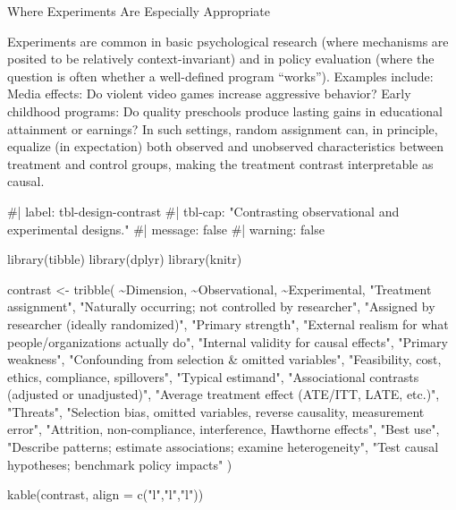 \documentclass[
  letterpaper,
  DIV=11,
  numbers=noendperiod]{scrreprt}
\newenvironment{Shaded}{\begin{snugshade}}{\end{snugshade}}
\newcommand{\AttributeTok}[1]{\textcolor[rgb]{0.40,0.45,0.13}{#1}}
\newcommand{\CommentTok}[1]{\textcolor[rgb]{0.37,0.37,0.37}{#1}}
\newcommand{\FunctionTok}[1]{\textcolor[rgb]{0.28,0.35,0.67}{#1}}
\newcommand{\NormalTok}[1]{\textcolor[rgb]{0.00,0.23,0.31}{#1}}
\newcommand{\OtherTok}[1]{\textcolor[rgb]{0.00,0.23,0.31}{#1}}
\newcommand{\SpecialCharTok}[1]{\textcolor[rgb]{0.37,0.37,0.37}{#1}}
\newcommand{\StringTok}[1]{\textcolor[rgb]{0.13,0.47,0.30}{#1}}
\begin{document}
Where Experiments Are Especially Appropriate

Experiments are common in basic psychological research (where mechanisms
are posited to be relatively context-invariant) and in policy evaluation
(where the question is often whether a well-defined program ``works'').
Examples include: Media effects: Do violent video games increase
aggressive behavior? Early childhood programs: Do quality preschools
produce lasting gains in educational attainment or earnings? In such
settings, random assignment can, in principle, equalize (in expectation)
both observed and unobserved characteristics between treatment and
control groups, making the treatment contrast interpretable as causal.

\begin{Shaded}
\begin{Highlighting}[]
\CommentTok{\#| label: tbl{-}design{-}contrast}
\CommentTok{\#| tbl{-}cap: "Contrasting observational and experimental designs."}
\CommentTok{\#| message: false}
\CommentTok{\#| warning: false}

\FunctionTok{library}\NormalTok{(tibble)}
\FunctionTok{library}\NormalTok{(dplyr)}
\FunctionTok{library}\NormalTok{(knitr)}

\NormalTok{contrast }\OtherTok{\textless{}{-}} \FunctionTok{tribble}\NormalTok{(}
  \SpecialCharTok{\textasciitilde{}}\NormalTok{Dimension, }\SpecialCharTok{\textasciitilde{}}\NormalTok{Observational, }\SpecialCharTok{\textasciitilde{}}\NormalTok{Experimental,}
  \StringTok{"Treatment assignment"}\NormalTok{, }\StringTok{"Naturally occurring; not controlled by researcher"}\NormalTok{, }\StringTok{"Assigned by researcher (ideally randomized)"}\NormalTok{,}
  \StringTok{"Primary strength"}\NormalTok{, }\StringTok{"External realism for what people/organizations actually do"}\NormalTok{, }\StringTok{"Internal validity for causal effects"}\NormalTok{,}
  \StringTok{"Primary weakness"}\NormalTok{, }\StringTok{"Confounding from selection \& omitted variables"}\NormalTok{, }\StringTok{"Feasibility, cost, ethics, compliance, spillovers"}\NormalTok{,}
  \StringTok{"Typical estimand"}\NormalTok{, }\StringTok{"Associational contrasts (adjusted or unadjusted)"}\NormalTok{, }\StringTok{"Average treatment effect (ATE/ITT, LATE, etc.)"}\NormalTok{,}
  \StringTok{"Threats"}\NormalTok{, }\StringTok{"Selection bias, omitted variables, reverse causality, measurement error"}\NormalTok{, }\StringTok{"Attrition, non{-}compliance, interference, Hawthorne effects"}\NormalTok{,}
  \StringTok{"Best use"}\NormalTok{, }\StringTok{"Describe patterns; estimate associations; examine heterogeneity"}\NormalTok{, }\StringTok{"Test causal hypotheses; benchmark policy impacts"}
\NormalTok{)}

\FunctionTok{kable}\NormalTok{(contrast, }\AttributeTok{align =} \FunctionTok{c}\NormalTok{(}\StringTok{"l"}\NormalTok{,}\StringTok{"l"}\NormalTok{,}\StringTok{"l"}\NormalTok{))}
\end{Highlighting}
\end{Shaded}
\end{document}
